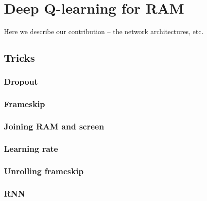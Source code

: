\chapter{Deep Q-learning for RAM}
Here we describe our contribution -- the network architectures, etc.

\section{Tricks}
\subsection{Dropout}
\subsection{Frameskip}
\subsection{Joining RAM and screen}
\subsection{Learning rate}
\subsection{Unrolling frameskip}
\subsection{RNN}
